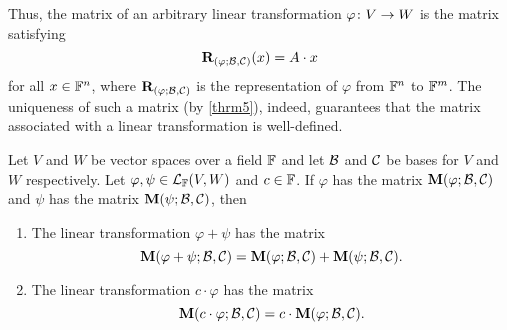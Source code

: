 Thus, the matrix of an arbitrary linear transformation $\varphi \colon V \to W$
is the matrix satisfying
%
\[
    \mathbf{R}_{(\varphi; \mathcal{B}, \mathcal{C})}(x) = A \cdot x    
\]
%
for all $x \in \mathbb{F}^{n}$, where $\mathbf{R}_{(\varphi; \mathcal{B}, \mathcal{C})}$ is the representation of $\varphi$
from $\mathbb{F}^{n}$ to $\mathbb{F}^{m}$. The uniqueness of such a matrix (by \cref{thrm5}),
indeed, guarantees that the matrix associated with a linear transformation is
well-defined.

\begin{lemma} \label{lem2}
    Let $V$ and $W$ be vector spaces over a field $\mathbb{F}$ and let $\mathcal{B}$
    and $\mathcal{C}$ be bases for $V$ and $W$ respectively. Let $\varphi, \psi \in
    \mathcal{L}_{\mathbb{F}}(V, W)$ and $c \in \mathbb{F}$. If $\varphi$ has the matrix
    $\mathbf{M}(\varphi; \mathcal{B}, \mathcal{C})$ and $\psi$ has the matrix
    $\mathbf{M}(\psi; \mathcal{B}, \mathcal{C})$, then
    \begin{enumerate}
        \item The linear transformation $\varphi + \psi$ has the matrix
        \[
            \mathbf{M}(\varphi + \psi; \mathcal{B}, \mathcal{C}) =
            \mathbf{M}(\varphi; \mathcal{B}, \mathcal{C}) + 
            \mathbf{M}(\psi; \mathcal{B}, \mathcal{C}).
        \]

        \item The linear transformation $c \cdot \varphi$ has the matrix
        \[
            \mathbf{M}(c \cdot \varphi; \mathcal{B}, \mathcal{C}) =
            c \cdot \mathbf{M}(\varphi; \mathcal{B}, \mathcal{C}).
        \]
    \end{enumerate}
\end{lemma}

